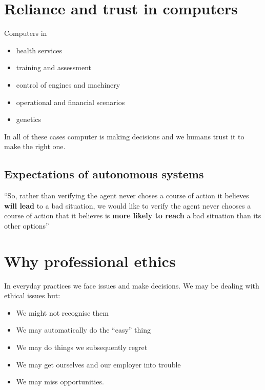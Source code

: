 \documentclass{article}
\begin{document}
\tableofcontents

\newpage

\section{Reliance and trust in computers}
Computers in
\begin{itemize}
  \item health services
  \item training and assessment
  \item control of engines and machinery
  \item operational and financial scenarios
  \item genetics
\end{itemize}
In all of these cases computer is making decisions and we humans trust it to make the right one.

\subsection{Expectations of autonomous systems}

``So, rather than verifying the agent never choses a course of action it believes \textbf{will lead} to a bad situation, we would like to verify the agent never chooses a course of action that it believes is \textbf{more likely to reach} a bad situation than its other options''

\section{Why professional ethics}

\begin{flushleft}
In everyday practices we face issues and make decisions. We may be dealing with ethical issues but:
\end{flushleft}
\begin{itemize}
  \item We might not recognise them
  \item We may automatically do the “easy” thing
  \item We may do things we subsequently regret
  \item We may get ourselves and our employer into trouble
  \item We may miss opportunities.
\end{itemize}
\end{document}
